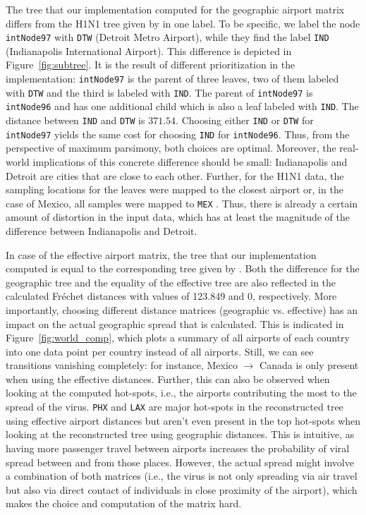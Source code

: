 \documentclass{article}
\begin{document}
The tree that our implementation computed for the geographic airport matrix
differs from the H1N1 tree given by
\cite{reimeringPhylogeographicReconstructionUsing2020} in one label. To be
specific, we label the node \texttt{intNode97} with \texttt{DTW} (Detroit Metro
Airport), while they find the label \texttt{IND} (Indianapolis International
Airport). This difference is depicted in Figure~\ref{fig:subtree}. It is the
result of different prioritization in the implementation: \texttt{intNode97} is
the parent of three leaves, two of them labeled with \texttt{DTW} and the third
is labeled with \texttt{IND}. The parent of \texttt{intNode97} is
\texttt{intNode96} and has one additional child which is also a leaf labeled
with \texttt{IND}. The distance between \texttt{IND} and \texttt{DTW} is
$371.54$. Choosing either \texttt{IND} or \texttt{DTW} for \texttt{intNode97}
yields the same cost for choosing \texttt{IND} for \texttt{intNode96}. Thus,
from the perspective of maximum parsimony, both choices are optimal. Moreover,
the real-world implications of this concrete difference should be small:
Indianapolis and Detroit are cities that are close to each other. Further, for
the H1N1 data,  the sampling locations for the leaves were mapped to the closest
airport or, in the case of Mexico, all samples were mapped to \texttt{MEX}
\cite{reimeringDistanceMatricesParsimonious2019}. Thus, there is already a
certain amount of distortion in the input data, which has at least the magnitude
of the difference between Indianapolis and Detroit.

In case of the effective airport matrix, the tree that our implementation
computed is equal to the corresponding tree given by
\cite{reimeringPhylogeographicReconstructionUsing2020}. Both the difference for
the geographic tree and the equality of the effective tree are also reflected in
the calculated Fr\'{e}chet distances with values of 123.849 and 0, respectively.
More importantly, choosing different distance matrices (geographic vs.
effective) has an impact on the actual geographic spread that is calculated.
This is indicated in Figure~\ref{fig:world_comp}, which plots a summary of all
airports of each country into one data point per country instead of all
airports. Still, we can see transitions vanishing completely: for instance,
Mexico $\rightarrow$ Canada is only present when using the effective distances.
Further, this can also be observed when looking at the computed hot-spots, i.e.,
the airports contributing the most to the spread of the virus. \texttt{PHX} and
\texttt{LAX} are major hot-spots in the reconstructed tree using effective
airport distances but aren't even present in the top hot-spots when looking at
the reconstructed tree using geographic distances. This is intuitive, as having
more passenger travel between airports increases the probability of viral spread
between and from those places. However, the actual spread might involve a
combination of both matrices (i.e., the virus is not only spreading via air
travel but also via direct contact of individuals in close proximity of the
airport), which makes the choice and computation of the matrix hard.
\end{document}
